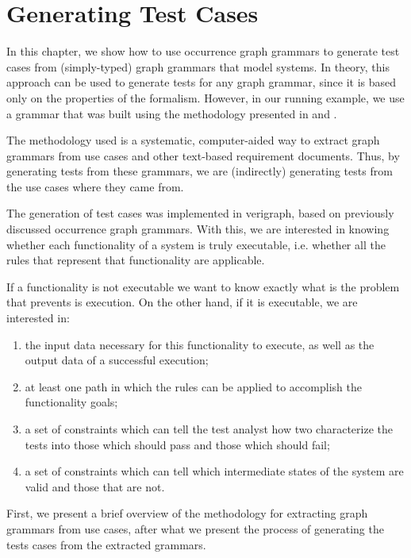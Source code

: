 \chapter{Generating Test Cases}\label{ch:tests}

In this chapter, we show how to use occurrence graph grammars to generate test cases from (simply-typed) graph grammars that model systems. In theory, this approach can be used to generate tests for any graph grammar, since it is based only on the properties of the formalism. However, in our running example, we use a grammar that was built using the methodology presented in \cite{Junior2015} and \cite{BezerraWEIT2016}.

The methodology used is a systematic, computer-aided way to extract graph grammars from use cases and other text-based requirement documents. Thus, by generating tests from these grammars, we are (indirectly) generating tests from the use cases where they came from.

The generation of test cases was implemented in verigraph, based on previously discussed occurrence graph grammars. With this, we are interested in knowing whether each functionality of a system is truly executable, i.e. whether all the rules that represent that functionality are applicable. 

If a functionality is not executable we want to know exactly what is the problem that prevents is execution. On the other hand, if it is executable, we are interested in:

\begin{enumerate}
\item the input data necessary for this functionality to execute, as well as the output data of a successful execution;

\item at least one path in which the rules can be applied to accomplish the functionality goals;

\item a set of constraints which can tell the test analyst how two characterize the tests into those which should pass and those which should fail;

\item a set of constraints which can tell which intermediate states of the system are valid and those that are not.
\end{enumerate}

First, we present a brief overview of the methodology for extracting graph grammars from use cases, after what we present the process of generating the tests cases from the extracted grammars.

